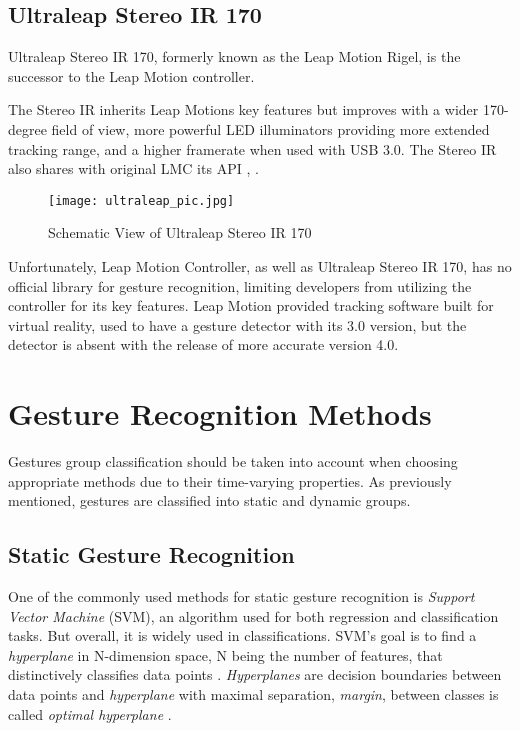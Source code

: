\subsection{Ultraleap Stereo IR 170}

Ultraleap Stereo IR 170, formerly known as the Leap Motion Rigel, is the successor to the Leap Motion controller.

The Stereo IR inherits Leap Motions key features but improves with a wider 170-degree field of view, more powerful LED illuminators providing more extended tracking range, and a higher framerate when used with USB 3.0. The Stereo IR also shares with original LMC its API \cite{ultraleap}, \cite{ultraleap2}.

\begin{figure}[H]
    \centering
    \texttt{[image: ultraleap\_pic.jpg]}
    \caption{Schematic View of Ultraleap Stereo IR 170 \cite{ultraleap}}
    \label{fig:UltraLeapscheme}
\end{figure}

Unfortunately, Leap Motion Controller, as well as Ultraleap Stereo IR 170, has no official library for gesture recognition, limiting developers from utilizing the controller for its key features. Leap Motion provided tracking software built for virtual reality, used to have a gesture detector with its 3.0 version, but the detector is absent with the release of more accurate version 4.0.


\section{Gesture Recognition Methods
}

Gestures group classification should be taken into account when choosing appropriate methods due to their time-varying properties. As previously mentioned, gestures are classified into static and dynamic groups. 

\subsection{Static Gesture Recognition}

One of the commonly used methods for static gesture recognition is \textit{Support Vector Machine} (SVM), an algorithm used for both regression and classification tasks. But overall, it is widely used in classifications. SVM's goal is to find a \textit{hyperplane} in N-dimension space, N being the number of features, that distinctively classifies data points \cite{svmIntroToML}. \textit{Hyperplanes} are decision boundaries between data points and \textit{hyperplane} with maximal separation, \textit{margin}, between classes is called \textit{optimal hyperplane} \cite{savaris}.

